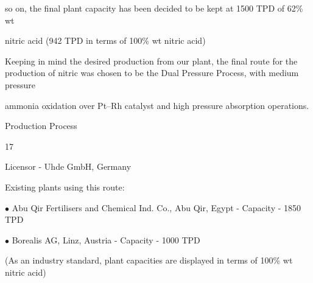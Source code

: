 \documentclass[a4paper,portrait,12pt]{article}
\begin{document}
\begin{flushleft}
so on, the final plant capacity has been decided to be kept at 1500 TPD of 62\% wt
\end{flushleft}


\begin{flushleft}
nitric acid (942 TPD in terms of 100\% wt nitric acid)
\end{flushleft}


\begin{flushleft}
Keeping in mind the desired production from our plant, the final route for the production of nitric was chosen to be the Dual Pressure Process, with medium pressure
\end{flushleft}


\begin{flushleft}
ammonia oxidation over Pt--Rh catalyst and high pressure absorption operations.
\end{flushleft}





\begin{flushleft}
\newpage
Production Process
\end{flushleft}





17





\begin{flushleft}
Licensor - Uhde GmbH, Germany
\end{flushleft}


\begin{flushleft}
Existing plants using this route:
\end{flushleft}





\begin{flushleft}
$\bullet$ Abu Qir Fertilisers and Chemical Ind. Co., Abu Qir, Egypt - Capacity - 1850 TPD
\end{flushleft}


\begin{flushleft}
$\bullet$ Borealis AG, Linz, Austria - Capacity - 1000 TPD
\end{flushleft}





\begin{flushleft}
(As an industry standard, plant capacities are displayed in terms of 100\% wt nitric acid)
\end{flushleft}
\end{document}
